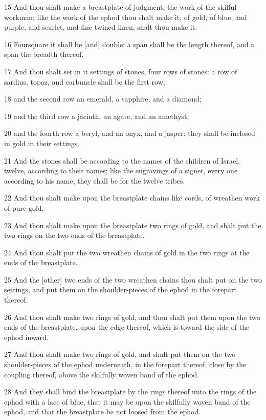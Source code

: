 \par 15 And thou shalt make a breastplate of judgment, the work of the skilful workman; like the work of the ephod thou shalt make it; of gold, of blue, and purple, and scarlet, and fine twined linen, shalt thou make it.
\par 16 Foursquare it shall be [and] double; a span shall be the length thereof, and a span the breadth thereof.
\par 17 And thou shalt set in it settings of stones, four rows of stones: a row of sardius, topaz, and carbuncle shall be the first row;
\par 18 and the second row an emerald, a sapphire, and a diamond;
\par 19 and the third row a jacinth, an agate, and an amethyst;
\par 20 and the fourth row a beryl, and an onyx, and a jasper: they shall be inclosed in gold in their settings.
\par 21 And the stones shall be according to the names of the children of Israel, twelve, according to their names; like the engravings of a signet, every one according to his name, they shall be for the twelve tribes.
\par 22 And thou shalt make upon the breastplate chains like cords, of wreathen work of pure gold.
\par 23 And thou shalt make upon the breastplate two rings of gold, and shalt put the two rings on the two ends of the breastplate.
\par 24 And thou shalt put the two wreathen chains of gold in the two rings at the ends of the breastplate.
\par 25 And the [other] two ends of the two wreathen chains thou shalt put on the two settings, and put them on the shoulder-pieces of the ephod in the forepart thereof.
\par 26 And thou shalt make two rings of gold, and thou shalt put them upon the two ends of the breastplate, upon the edge thereof, which is toward the side of the ephod inward.
\par 27 And thou shalt make two rings of gold, and shalt put them on the two shoulder-pieces of the ephod underneath, in the forepart thereof, close by the coupling thereof, above the skilfully woven band of the ephod.
\par 28 And they shall bind the breastplate by the rings thereof unto the rings of the ephod with a lace of blue, that it may be upon the skilfully woven band of the ephod, and that the breastplate be not loosed from the ephod.
